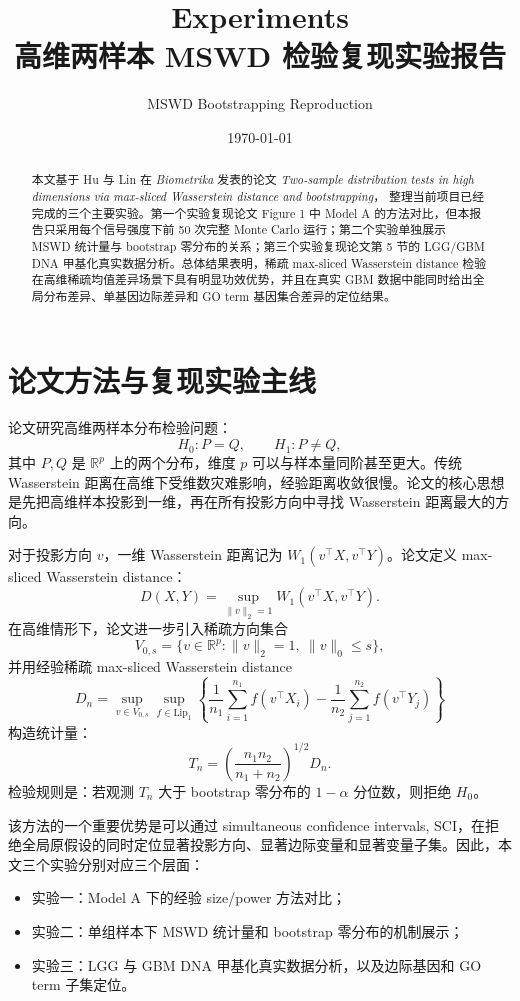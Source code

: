 \documentclass[UTF8,a4paper,11pt]{ctexart}
\title{\textbf{Experiments}\\高维两样本 MSWD 检验复现实验报告}
\author{MSWD Bootstrapping Reproduction}
\date{\today}
\begin{document}
\maketitle

\begin{abstract}
本文基于 Hu 与 Lin 在 \textit{Biometrika} 发表的论文
\textit{Two-sample distribution tests in high dimensions via max-sliced Wasserstein distance and bootstrapping}，
整理当前项目已经完成的三个主要实验。第一个实验复现论文 Figure 1 中 Model A 的方法对比，但本报告只采用每个信号强度下前 50 次完整 Monte Carlo 运行；第二个实验单独展示 MSWD 统计量与 bootstrap 零分布的关系；第三个实验复现论文第 5 节的 LGG/GBM DNA 甲基化真实数据分析。总体结果表明，稀疏 max-sliced Wasserstein distance 检验在高维稀疏均值差异场景下具有明显功效优势，并且在真实 GBM 数据中能同时给出全局分布差异、单基因边际差异和 GO term 基因集合差异的定位结果。
\end{abstract}

\section{论文方法与复现实验主线}

论文研究高维两样本分布检验问题：
\[
H_0:P=Q,\qquad H_1:P\neq Q,
\]
其中 \(P,Q\) 是 \(\mathbb{R}^p\) 上的两个分布，维度 \(p\) 可以与样本量同阶甚至更大。传统 Wasserstein 距离在高维下受维数灾难影响，经验距离收敛很慢。论文的核心思想是先把高维样本投影到一维，再在所有投影方向中寻找 Wasserstein 距离最大的方向。

对于投影方向 \(v\)，一维 Wasserstein 距离记为 \(W_1(v^\top X,v^\top Y)\)。论文定义 max-sliced Wasserstein distance：
\[
D(X,Y)=\sup_{\|v\|_2=1} W_1(v^\top X,v^\top Y).
\]
在高维情形下，论文进一步引入稀疏方向集合
\[
V_{0,s}=\{v\in\mathbb{R}^p:\|v\|_2=1,\ \|v\|_0\le s\},
\]
并用经验稀疏 max-sliced Wasserstein distance
\[
D_n=\sup_{v\in V_{0,s}}\sup_{f\in \mathrm{Lip}_1}
\left\{\frac{1}{n_1}\sum_{i=1}^{n_1}f(v^\top X_i)
-\frac{1}{n_2}\sum_{j=1}^{n_2}f(v^\top Y_j)\right\}
\]
构造统计量：
\[
T_n=\left(\frac{n_1n_2}{n_1+n_2}\right)^{1/2}D_n.
\]
检验规则是：若观测 \(T_n\) 大于 bootstrap 零分布的 \(1-\alpha\) 分位数，则拒绝 \(H_0\)。

该方法的一个重要优势是可以通过 simultaneous confidence intervals, SCI，在拒绝全局原假设的同时定位显著投影方向、显著边际变量和显著变量子集。因此，本文三个实验分别对应三个层面：

\begin{itemize}
  \item 实验一：Model A 下的经验 size/power 方法对比；
  \item 实验二：单组样本下 MSWD 统计量和 bootstrap 零分布的机制展示；
  \item 实验三：LGG 与 GBM DNA 甲基化真实数据分析，以及边际基因和 GO term 子集定位。
\end{itemize}
\end{document}
